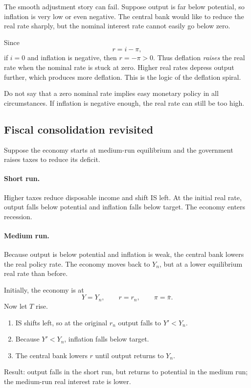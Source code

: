 \documentclass[12pt]{article}
\begin{document}
The smooth adjustment story can fail. Suppose output is far below potential, so inflation is very low or even negative. The central bank would like to reduce the real rate sharply, but the nominal interest rate cannot easily go below zero.

Since
\[
r=i-\pi,
\]
if $i=0$ and inflation is negative, then $r=-\pi>0$. Thus deflation \emph{raises} the real rate when the nominal rate is stuck at zero. Higher real rates depress output further, which produces more deflation. This is the logic of the deflation spiral.

\begin{commonmistake}
Do not say that a zero nominal rate implies easy monetary policy in all circumstances. If inflation is negative enough, the real rate can still be too high.
\end{commonmistake}

\subsection{Fiscal consolidation revisited}

Suppose the economy starts at medium-run equilibrium and the government raises taxes to reduce its deficit.

\paragraph{Short run.}
Higher taxes reduce disposable income and shift IS left. At the initial real rate, output falls below potential and inflation falls below target. The economy enters recession.

\paragraph{Medium run.}
Because output is below potential and inflation is weak, the central bank lowers the real policy rate. The economy moves back to $Y_n$, but at a lower equilibrium real rate than before.

\begin{examplebox}[title={Worked Example: Short-run versus medium-run effect of higher taxes}]
Initially, the economy is at
\[
Y=Y_n,\qquad r=r_n,\qquad \pi=\bar{\pi}.
\]
Now let $T$ rise.
\begin{enumerate}[leftmargin=1.5em]
\item IS shifts left, so at the original $r_n$ output falls to $Y'<Y_n$.
\item Because $Y'<Y_n$, inflation falls below target.
\item The central bank lowers $r$ until output returns to $Y_n$.
\end{enumerate}
Result: output falls in the short run, but returns to potential in the medium run; the medium-run real interest rate is lower.
\end{examplebox}
\end{document}
